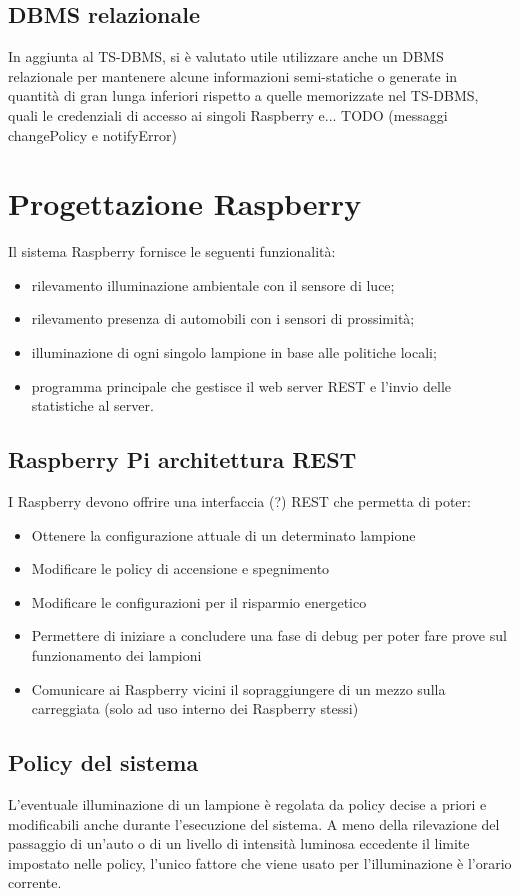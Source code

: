 \subsection{DBMS relazionale}
In aggiunta al TS-DBMS, si è valutato utile utilizzare anche un DBMS relazionale per mantenere alcune informazioni semi-statiche o generate in quantità di gran lunga inferiori rispetto a quelle memorizzate nel TS-DBMS, quali le credenziali di accesso ai singoli Raspberry e...
TODO (messaggi changePolicy e notifyError)


\section{Progettazione Raspberry}
Il sistema Raspberry fornisce le seguenti funzionalità:
\begin{itemize}
 \item rilevamento illuminazione ambientale con il sensore di luce;
 \item rilevamento presenza di automobili con i sensori di prossimità;
 \item illuminazione di ogni singolo lampione in base alle politiche locali;
 \item programma principale che gestisce il web server REST e l'invio delle statistiche al server.
\end{itemize}

\subsection{Raspberry Pi architettura REST}
I Raspberry devono offrire una interfaccia (?) REST che permetta di poter:
\begin{itemize}
	\item Ottenere la configurazione attuale di un determinato lampione
	\item Modificare le policy di accensione e spegnimento
	\item Modificare le configurazioni per il risparmio energetico
	\item Permettere di iniziare a concludere una fase di debug per poter fare prove sul funzionamento dei lampioni
	\item Comunicare ai Raspberry vicini il sopraggiungere di un mezzo sulla carreggiata (solo ad uso interno dei Raspberry stessi)
\end{itemize}

\subsection{Policy del sistema}
L'eventuale illuminazione di un lampione è regolata da policy decise a priori e modificabili anche durante l'esecuzione del sistema.
A meno della rilevazione del passaggio di un'auto o di un livello di intensità luminosa eccedente il limite impostato nelle policy, l'unico fattore che viene usato per l'illuminazione è l'orario corrente.
